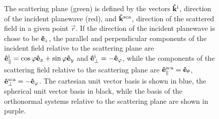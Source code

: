\begin{figure}[h!]
%
\caption[Scattering plane unit vector systems]{The scattering plane (green) is defined by the vectors $\vu{k}^\text{i}$, direction of the incident planewave (red), and $\vu{k}^\text{sca}$, direction of the scattered field in a given point $\vec{r}$. If the direction of the incident planewave is chose to be $\vu{e}_z$, the parallel and perpendicular components of the incident field relative to the scattering plane are $\vu{e}_\parallel^\text{i} = \cos\varphi\vu{e}_x +\sin\varphi\vu{e}_y$ and  $\vu{e}_\perp^\text{i} = -\vu{e}_\varphi$, while the components of the scattering field relative to the scattering plane are $\vu{e}_\parallel^\text{sca} = \vu{e}_\theta$, $\vu{e}_\perp^\text{sca} = - \vu{e}_\varphi$. The cartesian unit vector basis is shown in blue, the spherical unit vector basis in black, while the basis of the orthonormal systems relative to the scattering plane are shown in purple. }
\label{fig:ScatPlane}
	\end{figure}

